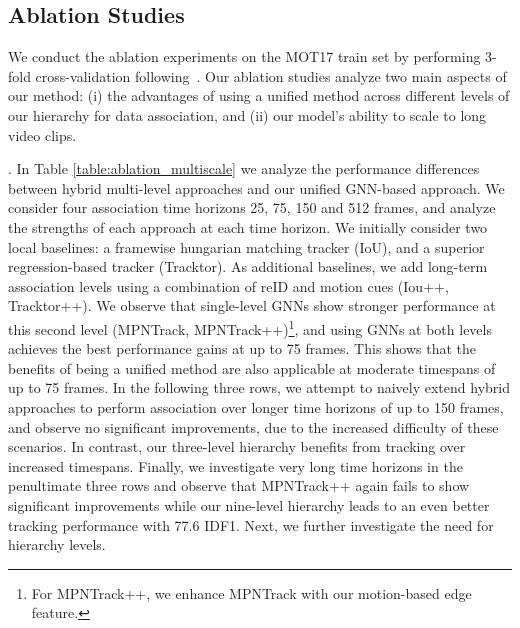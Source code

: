 \documentclass[10pt,twocolumn,letterpaper]{article}
\begin{document}
{{\subsection{Ablation Studies}
We conduct the ablation experiments on the MOT17 train set by performing 3-fold cross-validation following~\cite{mpntrack}. Our
ablation studies analyze two main aspects of our method: 
(i) the advantages of using a unified method across different levels of our hierarchy for data association, and
(ii) our model's ability to scale to long video clips.
















. In Table \ref{table:ablation_multiscale} we analyze the performance differences between hybrid multi-level approaches and our unified GNN-based approach. We consider four association time horizons 25, 75, 150 and 512 frames, and analyze the strengths of each approach at each time horizon. We initially consider two local baselines: a framewise hungarian matching tracker (IoU), and a superior regression-based tracker (Tracktor)\cite{tracktor}. 
As additional baselines, we add long-term association levels using a combination of reID and motion cues (Iou++, Tracktor++). We observe that single-level GNNs show stronger performance at this second level (MPNTrack, MPNTrack++)\footnote{For MPNTrack++, we enhance MPNTrack  with our motion-based edge  feature. }, and using GNNs at both levels achieves the best performance gains at up to 75 frames. 
This shows that the benefits of being a unified method are also applicable at moderate timespans of up to 75 frames. In the following three rows, we attempt to naively extend hybrid approaches to perform association over longer time horizons of up to 150 frames, and observe no significant improvements, due to the increased difficulty of these scenarios. In contrast, our three-level hierarchy benefits from tracking over increased timespans. 
Finally, we investigate very long time horizons in the penultimate three rows and observe that MPNTrack++ again fails to show significant improvements while our nine-level hierarchy leads to an even better tracking performance with 77.6 IDF1. 
Next, we further investigate the need for hierarchy levels.



}}
\end{document}
